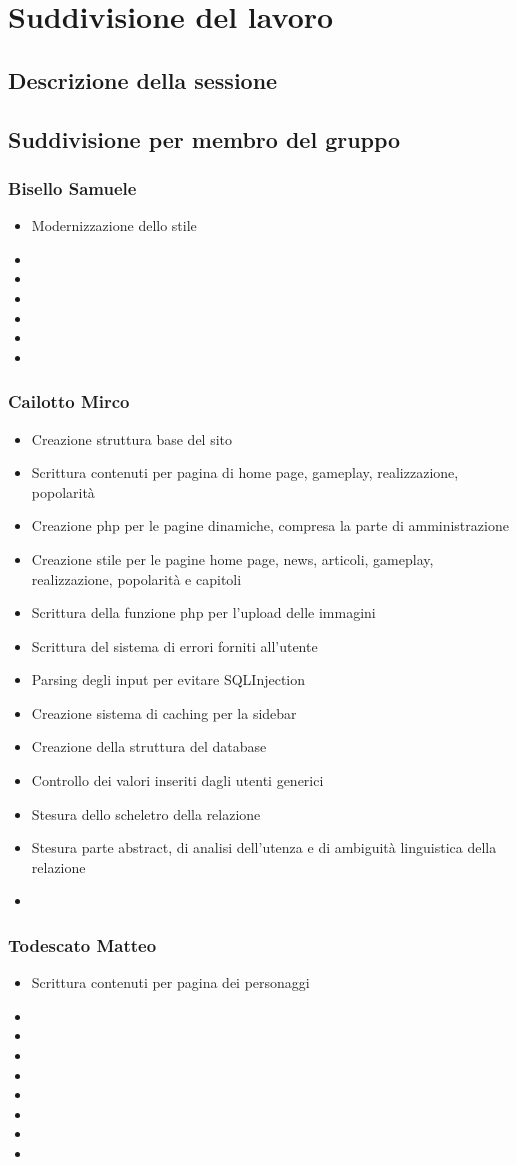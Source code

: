 \documentclass[openany, a4paper, 12pt]{report}
\begin{document}
	\chapter{Suddivisione del lavoro}
	\section{Descrizione della sessione}
	\section{Suddivisione per membro del gruppo}
	\subsection{Bisello Samuele}
	\begin{itemize}
		\item Modernizzazione dello stile
		\item 
		\item 
		\item 
		\item 
		\item 
		\item 
	\end{itemize}
	\subsection{Cailotto Mirco}
	\begin{itemize}
		\item Creazione struttura base del sito
		\item Scrittura contenuti per pagina di home page, gameplay, realizzazione, popolarità
		\item Creazione php per le pagine dinamiche, compresa la parte di amministrazione
		\item Creazione stile per le pagine home page, news, articoli, gameplay, realizzazione, popolarità e capitoli
		\item Scrittura della funzione php per l'upload delle immagini
		\item Scrittura del sistema di errori forniti all'utente
		\item Parsing degli input per evitare SQLInjection
		\item Creazione sistema di caching per la sidebar
		\item Creazione della struttura del database
		\item Controllo dei valori inseriti dagli utenti generici
		\item Stesura dello scheletro della relazione
		\item Stesura parte abstract, di analisi dell'utenza e di ambiguità linguistica della relazione
		\item 
	\end{itemize}
	\subsection{Todescato Matteo}
	\begin{itemize}
		\item Scrittura contenuti per pagina dei personaggi 
		\item 
		\item 
		\item 
		\item 
		\item 
		\item 
		\item 
		\item 
	\end{itemize}
\end{document}
